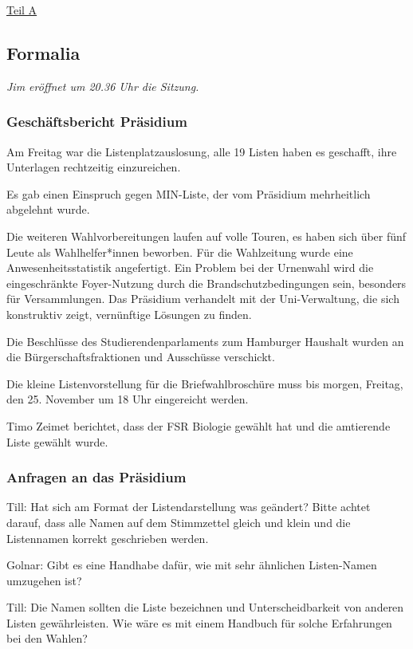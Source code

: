 \documentclass[ngerman,headheight=70pt]{scrartcl}
\begin{document}
    {\Large \underline{Teil A}}

    \subsection{Formalia}

    \textit{Jim eröffnet um 20.36 Uhr die Sitzung.}

    \subsubsection{Geschäftsbericht Präsidium}

    Am Freitag war die Listenplatzauslosung, alle 19 Listen haben es geschafft,
    ihre Unterlagen rechtzeitig einzureichen.

    Es gab einen Einspruch gegen MIN-Liste, der vom Präsidium mehrheitlich
    abgelehnt wurde.

    Die weiteren Wahlvorbereitungen laufen auf volle Touren, es haben sich über
    fünf Leute als Wahlhelfer*innen beworben. Für die Wahlzeitung wurde eine
    Anwesenheitsstatistik angefertigt. Ein Problem bei der Urnenwahl wird die
    eingeschränkte Foyer-Nutzung durch die Brandschutzbedingungen sein, besonders
    für Versammlungen. Das Präsidium verhandelt mit der Uni-Verwaltung, die sich
    konstruktiv zeigt, vernünftige Lösungen zu finden.

    Die Beschlüsse des Studierendenparlaments zum Hamburger Haushalt wurden an
    die Bürgerschaftsfraktionen und Ausschüsse verschickt.

    Die kleine Listenvorstellung für die Briefwahlbroschüre muss bis morgen,
    Freitag, den 25. November um 18 Uhr eingereicht werden.

    Timo Zeimet berichtet, dass der FSR Biologie gewählt hat und die amtierende
    Liste gewählt wurde.

    \subsubsection{Anfragen an das Präsidium}

    Till: Hat sich am Format der Listendarstellung was geändert? Bitte achtet
    darauf, dass alle Namen auf dem Stimmzettel gleich und klein und die
    Listennamen korrekt geschrieben werden.

    Golnar: Gibt es eine Handhabe dafür, wie mit sehr ähnlichen Listen-Namen
    umzugehen ist?

    Till: Die Namen sollten die Liste bezeichnen und Unterscheidbarkeit von
    anderen Listen gewährleisten. Wie wäre es mit einem Handbuch für solche
    Erfahrungen bei den Wahlen?
\end{document}
